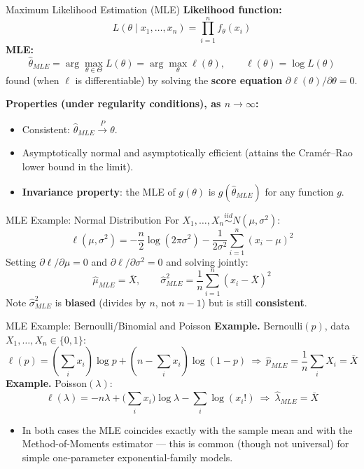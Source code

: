 \documentclass[11pt,aspectratio=169]{beamer}
\newcommand{\Xbar}{\bar{X}}
\newcommand{\Ex}[1]{\textbf{Example.} #1}
\begin{document}
\begin{frame}{Maximum Likelihood Estimation (MLE)}
\textbf{Likelihood function:}
\[
    L(\theta\mid x_1,\dots,x_n)=\prod_{i=1}^n f_\theta(x_i)
\]
\textbf{MLE:}
\[
    \hat\theta_{MLE}=\arg\max_{\theta\in\Theta} L(\theta)
    =\arg\max_\theta \ell(\theta), \qquad \ell(\theta)=\log L(\theta)
\]
found (when $\ell$ is differentiable) by solving the \textbf{score
equation} $\partial\ell(\theta)/\partial\theta=0$.

\textbf{Properties (under regularity conditions), as $n\to\infty$:}
\begin{itemize}
    \item Consistent: $\hat\theta_{MLE}\xrightarrow{P}\theta$.
    \item Asymptotically normal and asymptotically efficient (attains the
          Cram\'er--Rao lower bound in the limit).
    \item \textbf{Invariance property}: the MLE of $g(\theta)$ is
          $g(\hat\theta_{MLE})$ for any function $g$.
\end{itemize}
\end{frame}

\begin{frame}{MLE Example: Normal Distribution}
For $X_1,\dots,X_n\stackrel{iid}\sim N(\mu,\sigma^2)$:
\[
    \ell(\mu,\sigma^2)=-\frac n2\log(2\pi\sigma^2)
    -\frac{1}{2\sigma^2}\sum_{i=1}^n (x_i-\mu)^2
\]
Setting $\partial \ell/\partial\mu=0$ and $\partial\ell/\partial\sigma^2=0$
and solving jointly:
\[
    \hat\mu_{MLE}=\Xbar, \qquad
    \hat\sigma^2_{MLE}=\frac1n\sum_{i=1}^n (x_i-\Xbar)^2
\]
Note $\hat\sigma^2_{MLE}$ is \textbf{biased} (divides by $n$, not $n-1$)
but is still \textbf{consistent}.
\end{frame}

\begin{frame}{MLE Example: Bernoulli/Binomial and Poisson}
\Ex{Bernoulli$(p)$, data $X_1,\dots,X_n\in\{0,1\}$:}
\[
    \ell(p)=\left(\sum_i x_i\right)\log p + \left(n-\sum_i x_i\right)\log(1-p)
    \ \Rightarrow\ \hat p_{MLE}=\frac1n\sum_i X_i = \Xbar
\]
\Ex{Poisson$(\lambda)$:}
\[
    \ell(\lambda)= -n\lambda + \Big(\sum_i x_i\Big)\log\lambda - \sum_i\log(x_i!)
    \ \Rightarrow\ \hat\lambda_{MLE}=\Xbar
\]
\begin{itemize}
    \item In both cases the MLE coincides exactly with the sample mean and
          with the Method-of-Moments estimator — this is common (though not
          universal) for simple one-parameter exponential-family models.
\end{itemize}
\end{frame}
\end{document}
